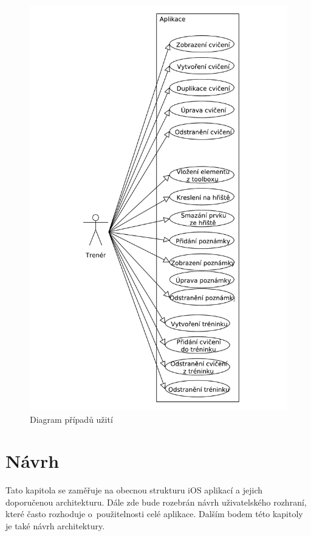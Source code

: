 \documentclass[thesis=B,czech]{FITthesis}[2012/06/26]
\begin{document}
	\begin{figure}[h!t]
		\centering
		\includegraphics[width=\textwidth]{img/use_case}
		\caption{Diagram případů užití}
		\label{pic:use_case}
	\end{figure}

\chapter{Návrh}

	Tato kapitola se zaměřuje na obecnou strukturu iOS aplikací a jejich doporučenou architekturu. Dále zde bude rozebrán návrh uživatelského rozhraní, které často rozhoduje o~použitelnosti celé aplikace. Dalším bodem této kapitoly je také návrh architektury.
\end{document}
